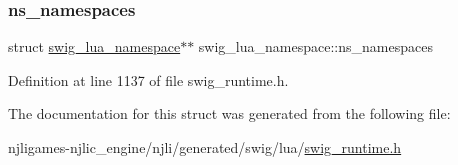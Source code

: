 \subsubsection{\texorpdfstring{ns\+\_\+namespaces}{ns\_namespaces}}
{\footnotesize\ttfamily struct \mbox{\hyperlink{structswig__lua__namespace}{swig\+\_\+lua\+\_\+namespace}}$\ast$$\ast$ swig\+\_\+lua\+\_\+namespace\+::ns\+\_\+namespaces}



Definition at line 1137 of file swig\+\_\+runtime.\+h.



The documentation for this struct was generated from the following file\+:\begin{DoxyCompactItemize}
\item 
njligames-\/njlic\+\_\+engine/njli/generated/swig/lua/\mbox{\hyperlink{swig__runtime_8h}{swig\+\_\+runtime.\+h}}\end{DoxyCompactItemize}
